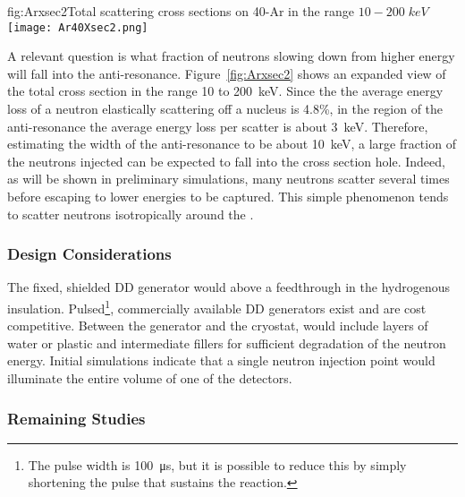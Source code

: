 \begin{dunefigure}[h]{fig:Arxsec2}{Total scattering cross sections on 40-Ar in the range $10-200\; keV$~\cite{ref:ENDF}}
\texttt{[image: Ar40Xsec2.png]}
\end{dunefigure}

A relevant question is what fraction of neutrons slowing down from higher energy will fall into the anti-resonance. Figure~\ref{fig:Arxsec2} shows an expanded view of the total  cross section in the range  \num{10} to \SI{200}{\keV}. Since the the average energy loss of a neutron elastically scattering off a  nucleus is \num{4.8}\%, in the region of the anti-resonance the average energy loss per scatter is about \SI{3}{\keV}. Therefore, estimating the width of the anti-resonance to be about   \SI{10}{\keV}, a large fraction of the neutrons injected can be expected to fall into the cross section hole. Indeed, as will be shown in preliminary simulations, many neutrons scatter several times before escaping to lower energies to be captured. This simple phenomenon tends to scatter neutrons isotropically around the .


\subsubsection{Design Considerations} 


The fixed, shielded DD generator would  above a feedthrough in the hydrogenous insulation. Pulsed\footnote{The pulse width is \SI{100}{\micro\s}, but it is possible to reduce this by simply shortening the  pulse that sustains the reaction.}, commercially available DD generators exist and are cost competitive. Between the generator and the cryostat,  would include layers of water or plastic and intermediate fillers for sufficient degradation of the neutron energy.  Initial simulations indicate that a single neutron injection point would illuminate %
the entire volume of one of the  detectors.

\subsubsection{Remaining Studies}

